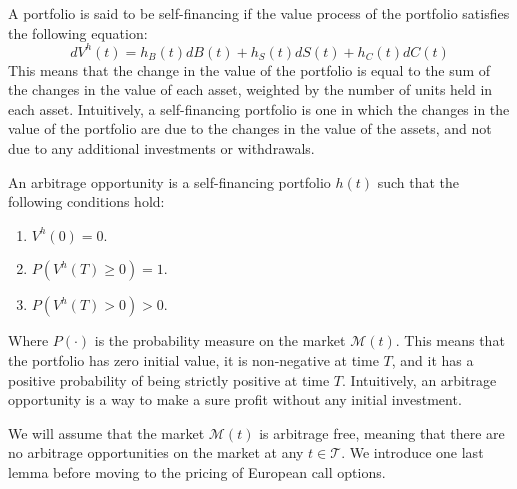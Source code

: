\begin{definition}
    A portfolio is said to be self-financing if the value process of the portfolio satisfies the following equation:
    \begin{equation}
        dV^h(t) = h_B(t)dB(t) + h_S(t)dS(t) + h_C(t)dC(t)
    \end{equation}
    This means that the change in the value of the portfolio is equal to the sum of the changes in the value of each asset, weighted by the number of units held in each asset. Intuitively, a self-financing portfolio is one in which the changes in the value of the portfolio are due to the changes in the value of the assets, and not due to any additional investments or withdrawals.
\end{definition}
\begin{definition}
    An arbitrage opportunity is a self-financing portfolio $h(t)$ such that the following conditions hold:
    \begin{enumerate}
        \item $V^h(0) = 0$.
        \item $P(V^h(T) \geq 0) = 1$.
        \item $P(V^h(T) > 0) > 0$.
    \end{enumerate}
    Where $P(\cdot)$ is the probability measure on the market $\mathcal{M}(t)$.
    This means that the portfolio has zero initial value, it is non-negative at time $T$, and it has a positive probability of being strictly positive at time $T$. Intuitively, an arbitrage opportunity is a way to make a sure profit without any initial investment.
\end{definition}
We will assume that the market $\mathcal{M}(t)$ is arbitrage free, meaning that there are no arbitrage opportunities on the market at any $t\in\mathcal{T}$. We introduce one last lemma before moving to the pricing of European call options.

